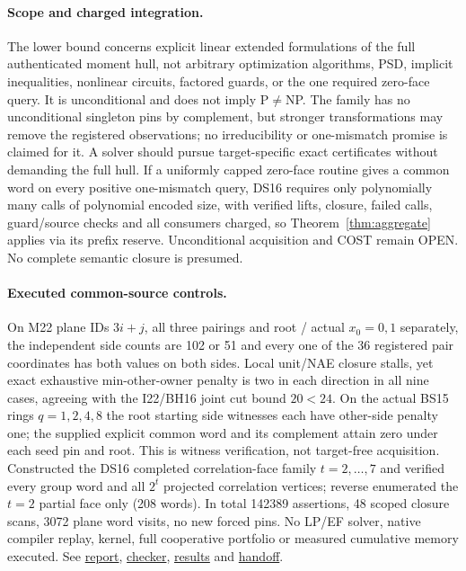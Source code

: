 \documentclass[11pt]{article}
\begin{document}
\paragraph{Scope and charged integration.}
The lower bound concerns explicit linear extended formulations of the full authenticated moment hull, not arbitrary optimization algorithms, PSD, implicit inequalities, nonlinear circuits, factored guards, or the one required zero-face query. It is unconditional and does not imply P$\ne$NP. The family has no unconditional singleton pins by complement, but stronger transformations may remove the registered observations; no irreducibility or one-mismatch promise is claimed for it. A solver should pursue target-specific exact certificates without demanding the full hull. If a uniformly capped zero-face routine gives a common word on every positive one-mismatch query, DS16 requires only polynomially many calls of polynomial encoded size, with verified lifts, closure, failed calls, guard/source checks and all consumers charged, so Theorem~\ref{thm:aggregate} applies via its prefix reserve. Unconditional acquisition and COST remain OPEN. No complete semantic closure is presumed.

\paragraph{Executed common-source controls.}
On M22 plane IDs $3i+j$, all three pairings and root / actual $x_0=0,1$ separately, the independent side counts are 102 or 51 and every one of the 36 registered pair coordinates has both values on both sides. Local unit/NAE closure stalls, yet exact exhaustive min-other-owner penalty is two in each direction in all nine cases, agreeing with the I22/BH16 joint cut bound $20<24$. On the actual BS15 rings $q=1,2,4,8$ the root starting side witnesses each have other-side penalty one; the supplied explicit common word and its complement attain zero under each seed pin and root. This is witness verification, not target-free acquisition. Constructed the DS16 completed correlation-face family $t=2,\ldots,7$ and verified every group word and all $2^t$ projected correlation vertices; reverse enumerated the $t=2$ partial face only (208 words). In total 142389 assertions, 48 scoped closure scans, 3072 plane word visits, no new forced pins. No LP/EF solver, native compiler replay, kernel, full cooperative portfolio or measured cumulative memory executed. See \href{https://github.com/j15marti/pnp/commit/4df86e848d8d9c122c75546744cc1b9f8cf9610e}{report}, \href{https://github.com/j15marti/pnp/commit/4ed2831e9707b2de741a6127b23bcfa1fe1de1db}{checker}, \href{https://github.com/j15marti/pnp/commit/6eeca02a751c2685eb77541a673ce556c9044271}{results} and \href{https://github.com/j15marti/pnp/commit/55a69634c56f10cdb50aa3365e5e0ef56317df6f}{handoff}.
\end{document}
